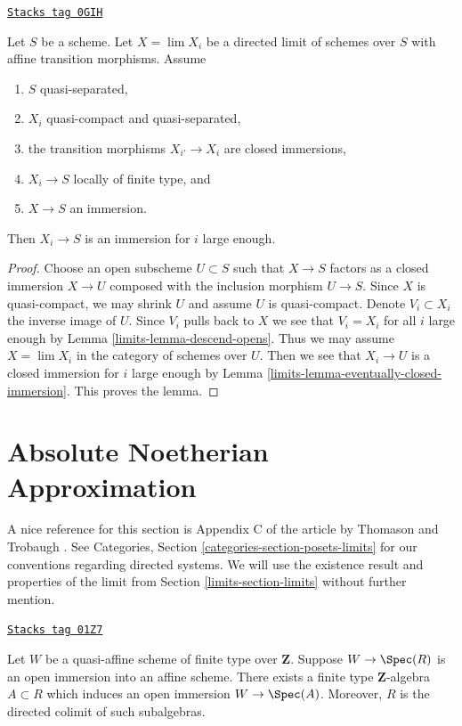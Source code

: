 \begin{lemma}
\label{limits-lemma-eventually-immersion}
\href{https://stacks.math.columbia.edu/tag/0GIH}{\texttt{Stacks tag 0GIH}}

Let $S$ be a scheme. Let $X = \lim X_i$ be a directed limit of schemes
over $S$ with affine transition morphisms. Assume
\begin{enumerate}
\item $S$ quasi-separated,
\item $X_i$ quasi-compact and quasi-separated,
\item the transition morphisms $X_{i'} \to X_i$ are closed immersions,
\item $X_i \to S$ locally of finite type, and
\item $X \to S$ an immersion.
\end{enumerate}
Then $X_i \to S$ is an immersion for $i$ large enough.
\end{lemma}

\begin{proof}

Choose an open subscheme $U \subset S$ such that $X \to S$ factors
as a closed immersion $X \to U$ composed with the inclusion morphism
$U \to S$. Since $X$ is quasi-compact, we may shrink $U$ and assume
$U$ is quasi-compact. Denote $V_i \subset X_i$ the inverse image of $U$.
Since $V_i$ pulls back to $X$ we see that $V_i = X_i$ for all $i$
large enough by Lemma \ref{limits-lemma-descend-opens}. Thus we may
assume $X = \lim X_i$ in the category of schemes over $U$.
Then we see that $X_i \to U$ is a closed immersion for $i$
large enough by Lemma \ref{limits-lemma-eventually-closed-immersion}.
This proves the lemma.
\end{proof}

\section{Absolute Noetherian Approximation}
\label{limits-section-approximation}
A nice reference for this section is Appendix C of the article
by Thomason and Trobaugh \cite{TT}.
See Categories, Section \ref{categories-section-posets-limits}
for our conventions regarding directed systems.
We will use the existence result and properties of the limit
from Section \ref{limits-section-limits} without further mention.

\begin{lemma}
\label{limits-lemma-quasi-affine-finite-type-over-Z}
\href{https://stacks.math.columbia.edu/tag/01Z7}{\texttt{Stacks tag 01Z7}}

Let $W$ be a quasi-affine scheme of finite type over
$\mathbf{Z}$. Suppose $W \to \Spec(R)$ is an
open immersion into an affine scheme. There exists a
finite type $\mathbf{Z}$-algebra $A \subset R$
which induces an open immersion $W \to \Spec(A)$.
Moreover, $R$ is the directed colimit of such subalgebras.
\end{lemma}

